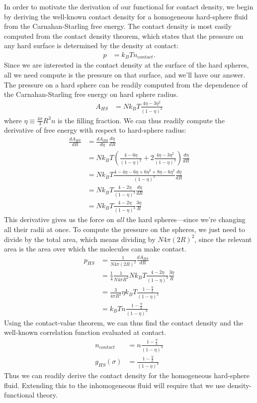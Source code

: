 \documentclass[letterpaper,twocolumn,amsmath,amssymb,jcp,10pt,aip]{revtex4-1}
\newcommand{\derivation}[1]{#1} %
\begin{document}
In order to motivate the derivation of our functional for contact
density, we begin by deriving the well-known contact density for a
homogeneous hard-sphere fluid from the Carnahan-Starling free energy.
The contact density is most easily computed from the contact density
theorem, which states that the pressure on any hard surface is
determined by the density at contact:
\begin{align}
  p &= k_BT n_\textit{contact}.
\end{align}
Since we are interested in the contact density at the surface of the
hard spheres, all we need compute is the pressure on that surface, and
we'll have our answer.  The pressure on a hard sphere can be readily
computed from the dependence of the Carnahan-Starling free energy on
hard sphere radius.
\begin{align}
  A_{HS} &= Nk_BT \frac{4\eta - 3\eta^2}{(1-\eta)^2}
\end{align}
where $\eta \equiv \frac{4\pi}{3} R^3 n$ is the filling fraction.  We
can thus readily compute the derivative of free energy with respect to
hard-sphere radius:
\begin{align}
  \frac{dA_{HS}}{dR} &= \frac{dA_{HS}}{d\eta} \frac{d\eta}{dR} \\
  \derivation{
    &= Nk_BT \left( \frac{4 - 6\eta}{(1-\eta)^2} + 2 \frac{4\eta - 3\eta^2}{(1-\eta)^3} \right) \frac{d\eta}{dR}
    \\
    &= Nk_BT \frac{4 - 4\eta - 6\eta + 6\eta^2 + 8\eta - 6\eta^2}{(1-\eta)^3} \frac{d\eta}{dR}
    \\
    &= Nk_BT \frac{4 - 2\eta}{(1-\eta)^3} \frac{d\eta}{dR}
    \\
  }
  &= Nk_BT \frac{4 - 2\eta}{(1-\eta)^3} \frac{3 \eta}{R} \label{eq:dAhsdR}
\end{align}
This derivative gives us the force on \emph{all} the hard
spheres---since we're changing all their radii at once.  To compute
the pressure on the spheres, we just need to divide by the total area,
which means dividing by $N 4\pi (2R)^2$, since the relevant area
is the area over which the molecules can make contact.
\begin{align}
  p_{HS} &= \frac{1}{N 4\pi (2R)^2} \frac{dA_{HS}}{dR} \\
  \derivation{
    &= \frac14 \frac{1}{N 4\pi R^2} Nk_BT \frac{4 - 2\eta}{(1-\eta)^3} \frac{3 \eta}{R} \\
    &= \frac{3}{4\pi R^3} \eta k_BT \frac{1 -
      \frac{\eta}2}{(1-\eta)^3} \\
  }
  &= k_BT n \frac{1 - \frac{\eta}2}{(1-\eta)^3}
\end{align}
Using the contact-value theorem, we can thus find the contact density
and the well-known correlation function evaluated at contact.
\begin{align}
  n_\textit{contact} &= n \frac{1 - \frac{\eta}2}{(1-\eta)^3} \\
  g_{HS}(\sigma) &= \frac{1 - \frac{\eta}2}{(1-\eta)^3}
\end{align}
Thus we can readily derive the contact density for the homogeneous
hard-sphere fluid.  Extending this to the inhomogeneous fluid will
require that we use density-functional theory.
\end{document}
